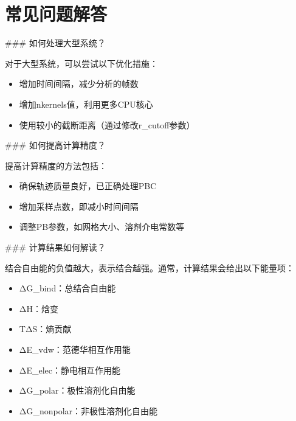 \documentclass[letterpaper,10pt,english]{sphinxmanual}
\begin{document}
\section{常见问题解答}
\label{\detokenize{quick_start:id10}}
\sphinxAtStartPar
\#\#\# 如何处理大型系统？

\sphinxAtStartPar
对于大型系统，可以尝试以下优化措施：
\begin{itemize}
\item {} 
\sphinxAtStartPar
增加时间间隔，减少分析的帧数

\item {} 
\sphinxAtStartPar
增加nkernels值，利用更多CPU核心

\item {} 
\sphinxAtStartPar
使用较小的截断距离（通过修改r\_cutoff参数）

\end{itemize}

\sphinxAtStartPar
\#\#\# 如何提高计算精度？

\sphinxAtStartPar
提高计算精度的方法包括：
\begin{itemize}
\item {} 
\sphinxAtStartPar
确保轨迹质量良好，已正确处理PBC

\item {} 
\sphinxAtStartPar
增加采样点数，即减小时间间隔

\item {} 
\sphinxAtStartPar
调整PB参数，如网格大小、溶剂介电常数等

\end{itemize}

\sphinxAtStartPar
\#\#\# 计算结果如何解读？

\sphinxAtStartPar
结合自由能的负值越大，表示结合越强。通常，计算结果会给出以下能量项：
\begin{itemize}
\item {} 
\sphinxAtStartPar
ΔG\_bind：总结合自由能

\item {} 
\sphinxAtStartPar
ΔH：焓变

\item {} 
\sphinxAtStartPar
TΔS：熵贡献

\item {} 
\sphinxAtStartPar
ΔE\_vdw：范德华相互作用能

\item {} 
\sphinxAtStartPar
ΔE\_elec：静电相互作用能

\item {} 
\sphinxAtStartPar
ΔG\_polar：极性溶剂化自由能

\item {} 
\sphinxAtStartPar
ΔG\_nonpolar：非极性溶剂化自由能

\end{itemize}
\end{document}
